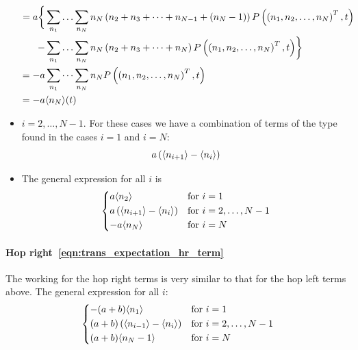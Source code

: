 \begin{itemize}
\begin{align*}
            = a\biggl\{
                & \sum_{n_1} \dotso \sum_{n_N} n_N \left(n_2 + n_3 +
                \dotsb + n_{N-1} + (n_N - 1)\right)
                P\left(\left(n_1,n_2,\dotsc,n_N\right)^T,t\right) \\
                - & \sum_{n_1} \dotso \sum_{n_N} n_N\left(n_2 + n_3 + \dotsb +
                n_N\right) P\left(\left(n_1,n_2,\dotsc,n_N\right)^T,t\right)
            \biggr\} \\
            = - a & \sum_{n_1} \dotsb \sum_{n_N} n_N
                P\left(\left(n_1,n_2,\dotsc,n_N\right)^T,t\right) \\
            = - a & \langle n_N \rangle(t)
        \end{align*}
    \item \(i=2,\dotsc,N-1\). For these cases we have a combination of terms of
        the type found in the cases \(i=1\) and \(i=N\):
        \begin{equation*}
            a\left(\langle n_{i+1} \rangle-\langle n_i \rangle\right)
        \end{equation*}
    \item The general expression for all \(i\) is
        \begin{equation*}
            \begin{dcases*}
                a\E{n_2} & for \(i=1\)\\
                a\left(\E{n_{i+1}} - \E{n_i}\right) & for \(i=2,\dotsc,N-1\)\\
                -a\E{n_N} & for \(i=N\)
            \end{dcases*}
        \end{equation*}
\end{itemize}

\paragraph{Hop right~\eqref{eqn:trans_expectation_hr_term}}
The working for the hop right terms is very similar to that for the hop left
terms above. The general expression for all \(i\):
\begin{equation*}
    \begin{dcases*}
        -(a+b)\E{n_1} & for \(i=1\)\\
        (a+b)\left(\E{n_{i-1}} - \E{n_i}\right) & for \(i=2,\dotsc,N-1\)\\
        (a+b)\E{n_N-1} & for \(i=N\)
    \end{dcases*}
\end{equation*}

